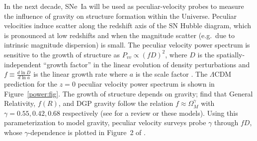 \documentclass[11pt, oneside]{article}   	%
\begin{document}
In the next decade, SNe~Ia will be used as peculiar-velocity probes to measure  the influence of gravity on structure formation within the Universe.
Peculiar velocities induce scatter along the redshift axis of the SN Hubble diagram, which is
pronounced at low redshifts and when the magnitude scatter (e.g.\ due to intrinsic magnitude dispersion) is small.
The peculiar velocity power spectrum is sensitive to the growth of structure as $P_{vv}\propto (fD)^2$, where $D$ is  the spatially-independent
``growth factor'' in the linear evolution of density perturbations and
$f \equiv \frac{d\ln{D}}{d\ln{a}}$ is the linear growth rate where $a$ is the scale factor  \cite{2006PhRvD..73l3526H,2011ApJ...741...67D}.
The $\Lambda$CDM prediction for the $z=0$ peculiar velocity power spectrum is shown in Figure~\ref{power:fig}. The growth of structure depends on gravity;
\cite{2007APh....28..481L} find that General Relativity, $f(R)$,  and DGP gravity follow the relation
$f \approx \Omega_M^\gamma$ with $\gamma=0.55, 0.42, 0.68$ respectively (see \cite{HUTERER201523} for a review
or these  models).  Using this parameterization to model gravity, peculiar velocity
surveys probe $\gamma$ through $fD$, whose $\gamma$-dependence is plotted 
in Figure~2 of  \cite{1475-7516-2013-04-031}.
%
\end{document}
